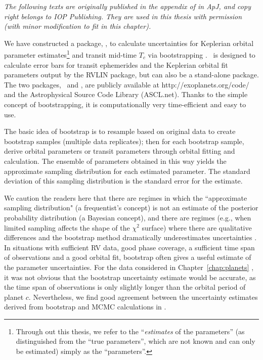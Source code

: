 {\it
  The following texts are originally published in the appendix of
  \cite{wang2012} in {\it ApJ}, and copy right belongs to IOP
  Publishing. They are used in this thesis with permission (with
  minor modification to fit in this chapter). 
}

We have constructed a package, \boottran, to calculate uncertainties
for Keplerian orbital parameter estimates\footnote{Through out this
  thesis, we refer to the ``{\it estimates} of the parameters'' (as
  distinguished from the ``true parameters'', which are not known and
  can only be estimated) simply as the ``parameters''.} and transit
mid-time $T_c$ via bootstrapping
\citep{1981,davison1997bootstrap}. \boottran\ is designed to calculate
error bars for transit ephemerides and the Keplerian orbital fit
parameters output by the RVLIN package\citep{rvlin}, but can also be a
stand-alone package. The two packages, \rvlin\ and \boottran, are
publicly available at http://exoplanets.org/code/ and the
Astrophysical Source Code Library (ASCL.net). Thanks to the simple
concept of bootstrapping, it is computationally very time-efficient
and easy to use.

The basic idea of bootstrap is to resample based on original data
to create bootstrap samples (multiple data replicates); then for
each bootstrap sample, derive orbital parameters or transit parameters
through orbital fitting and calculation. The ensemble of parameters
obtained in this way yields the approximate sampling distribution for
each estimated parameter. The standard deviation of this sampling
distribution is the standard error for the estimate.

We caution the readers here that there are regimes in which the
``approximate sampling distribution" (a frequentist's concept) is not
an estimate of the posterior probability distribution (a Bayesian
concept), and there are regimes (e.g., when limited sampling affects
the shape of the $\chi^2$ surface) where there are qualitative
differences and the bootstrap method dramatically underestimates
uncertainties \citep[e.g., long-period planets when the observations
  are not yet sufficient to pin down the orbital
  period;][]{Ford2005,Bender2012}. In situations with sufficient RV
data, good phase coverage, a sufficient time span of observations and
a good orbital fit, bootstrap often gives a useful estimate of the
parameter uncertainties. For the data considered in
Chapter~\ref{chap:planets} \citep{wang2012}, it was not obvious that
the bootstrap uncertainty estimate would be accurate, as the time span
of observations is only slightly longer than the orbital period of
planet $c$. Nevertheless, we find good agreement between the
uncertainty estimates derived from bootstrap and MCMC calculations in
\cite{wang2012}.


